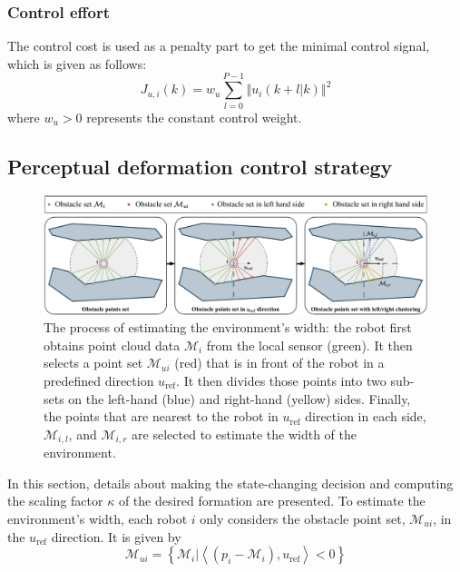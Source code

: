 \subsubsection{Control effort}
The control cost is used as a penalty part to get the minimal control signal, which is given as follows:
\begin{equation}
    J_{u,i}(k)=w_u\sum_{l=0}^{P-1}\left\Vert u_i(k+l|k)\right\Vert^2
\end{equation}
where $w_u>0$ represents the constant control weight.

\subsection{Perceptual deformation control strategy}\label{sec:obs_aware}
\begin{figure}
    \centering
    \includegraphics[width=\textwidth]{paper3/images/perception.pdf}
    \caption{The process of estimating the environment's width: the robot first obtains point cloud data $\mathcal{M}_i$ from the local sensor (green). It then selects a point set $\mathcal{M}_{ui}$ (red) that is in front of the robot in a predefined direction $u_\text{ref}$. It then divides those points into two sub-sets on the left-hand (blue) and right-hand (yellow) sides. Finally, the points that are nearest to the robot in $u_\text{ref}$ direction in each side, $\mathcal{M}_{i,l}$, and $\mathcal{M}_{i,r}$ are selected to estimate the width of the environment.}
    \label{fig:perception}
\end{figure}

In this section, details about making the state-changing decision and computing the scaling factor $\kappa$ of the desired formation are presented. To estimate the environment's width, each robot $i$ only considers the obstacle point set, $\mathcal{M}_{ui}$, in the $u_\text{ref}$ direction. It is given by
\begin{equation}
    \mathcal{M}_{ui} = \left\{\mathcal{M}_{i}\vert\left\langle\left(p_i-\mathcal{M}_{i}\right),u_\text{ref}\right\rangle<0\right\}
    \label{eqn:mui}
\end{equation}

